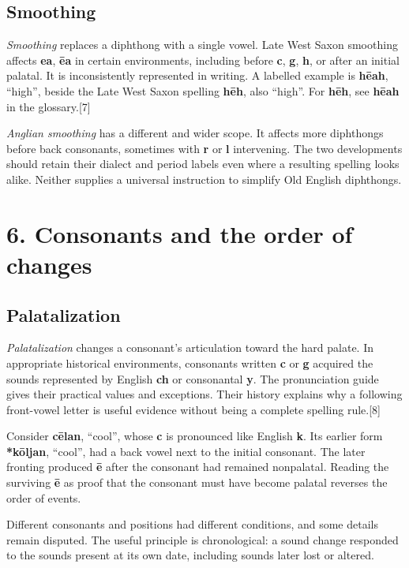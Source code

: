 \subsection*{Smoothing}
\emph{Smoothing} replaces a diphthong with a single vowel. Late West Saxon smoothing affects \textbf{ea}, \textbf{ēa} in certain environments, including before \textbf{c}, \textbf{g}, \textbf{h}, or after an initial palatal. It is inconsistently represented in writing. A labelled example is \textbf{hēah}, “high”, beside the Late West Saxon spelling \textbf{hēh}, also “high”. For \textbf{hēh}, see \textbf{hēah} in the glossary.[7]\par
\emph{Anglian smoothing} has a different and wider scope. It affects more diphthongs before back consonants, sometimes with \textbf{r} or \textbf{l} intervening. The two developments should retain their dialect and period labels even where a resulting spelling looks alike. Neither supplies a universal instruction to simplify Old English diphthongs.\par
\section*{6. Consonants and the order of changes}
\subsection*{Palatalization}
\emph{Palatalization} changes a consonant’s articulation toward the hard palate. In appropriate historical environments, consonants written \textbf{c} or \textbf{g} acquired the sounds represented by English \textbf{ch} or consonantal \textbf{y}. The pronunciation guide gives their practical values and exceptions. Their history explains why a following front-vowel letter is useful evidence without being a complete spelling rule.[8]\par
Consider \textbf{cēlan}, “cool”, whose \textbf{c} is pronounced like English \textbf{k}. Its earlier form \textbf{*kōljan}, “cool”, had a back vowel next to the initial consonant. The later fronting produced \textbf{ē} after the consonant had remained nonpalatal. Reading the surviving \textbf{ē} as proof that the consonant must have become palatal reverses the order of events.\par
Different consonants and positions had different conditions, and some details remain disputed. The useful principle is chronological: a sound change responded to the sounds present at its own date, including sounds later lost or altered.\par
